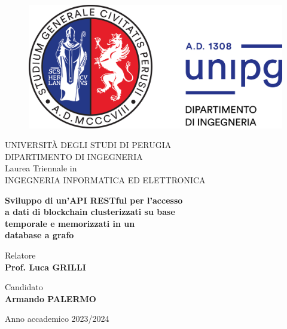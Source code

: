\documentclass{article}
\begin{document}
\begin{titlepage}
\begin{figure}[H]
    \centering
    \includegraphics[keepaspectratio=true,scale=0.4]{Images/logounipg}
\end{figure}

\begin{center}
    \LARGE{UNIVERSIT\`A DEGLI STUDI DI PERUGIA}
    \vspace{5mm}
    \\ \Large{DIPARTIMENTO DI INGEGNERIA}
    \vspace{5mm}
    \\ \LARGE{Laurea Triennale in \\ INGEGNERIA INFORMATICA ED ELETTRONICA}
   
\end{center}

\vspace{8mm}
\begin{center}
    {\LARGE{\bf Sviluppo di un'API RESTful per   l'accesso \\ \vspace{1mm}a dati di blockchain clusterizzati su base \\ \vspace{1mm}  temporale e  memorizzati  in un \\ \vspace{3mm} database a grafo }}
    
     
\end{center}
\vspace{20mm}

\begin{minipage}[t]{0.47\textwidth}
	{\large{Relatore}{\normalsize\vspace{3mm}
	\bf\\ \large{Prof. Luca GRILLI}}}
\end{minipage}
\hfill
\begin{minipage}[t]{0.47\textwidth}\raggedleft
	{\large{Candidato}{\normalsize\vspace{3mm} \bf\\ \large{Armando PALERMO}}}
\end{minipage}

\begin{center}
\vfill
\Large Anno accademico 2023/2024
\end{center}




\end{titlepage}
\end{document}
